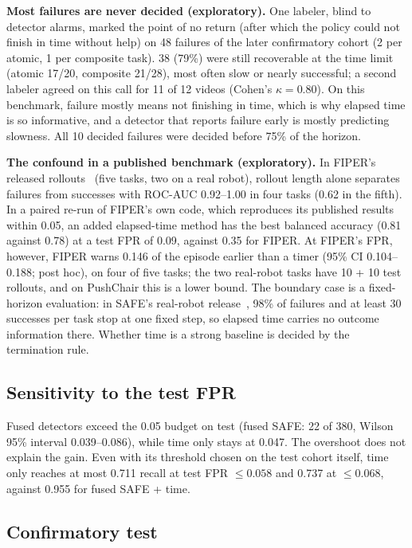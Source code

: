 \documentclass[conference,a4paper]{IEEEtran}
\begin{document}
\textbf{Most failures are never decided (exploratory).} One labeler, blind to detector
alarms, marked the point of no return (after which the policy could not finish in time
without help) on 48 failures of the later confirmatory cohort (2 per atomic, 1 per composite
task). 38 (79\%) were still recoverable at the time limit (atomic 17/20, composite 21/28),
most often slow or nearly successful; a second labeler agreed on this call for 11 of 12
videos (Cohen's $\kappa = 0.80$). On this benchmark, failure mostly means not finishing in
time, which is why elapsed time is so informative, and a detector that reports failure early
is mostly predicting slowness. All 10 decided failures were decided before 75\% of the
horizon.

\textbf{The confound in a published benchmark (exploratory).} In FIPER's released
rollouts~\cite{romer2025fiper} (five tasks, two on a real robot), rollout length alone
separates failures from successes with ROC-AUC 0.92--1.00 in four tasks (0.62 in the fifth).
In a paired re-run of FIPER's own code, which reproduces its published results within 0.05,
an added elapsed-time method has the best balanced accuracy (0.81 against 0.78) at a test FPR
of 0.09, against 0.35 for FIPER. At FIPER's FPR, however, FIPER warns 0.146 of the episode
earlier than a timer (95\% CI 0.104--0.188; post hoc), on four of five tasks; the two
real-robot tasks have 10 + 10 test rollouts, and on PushChair this is a lower bound. The boundary case is a fixed-horizon evaluation: in SAFE's real-robot
release~\cite{gu2025safe}, 98\% of failures and at least 30 successes per task stop at one
fixed step, so elapsed time carries no outcome information there. Whether time is a strong
baseline is decided by the termination rule.

\subsection{Sensitivity to the test FPR}

Fused detectors exceed the 0.05 budget on test (fused SAFE: 22 of 380, Wilson 95\% interval
0.039--0.086), while time only stays at 0.047. The overshoot does not explain the gain. Even with its
threshold chosen on the test cohort itself, time only reaches at most 0.711 recall at test
FPR $\le 0.058$ and 0.737 at $\le 0.068$, against 0.955 for fused SAFE + time.

\subsection{Confirmatory test}
\end{document}
